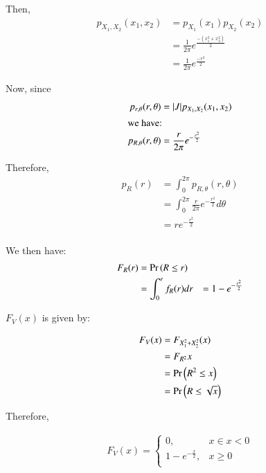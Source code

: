 \documentclass[journal,12pt,twocolumn]{IEEEtran}
\renewcommand\thesection{\arabic{section}}
\begin{document}
\begin{enumerate}[label=\thesection.\arabic*
,ref=\thesection.\theenumi]
Then, 
\begin{align}
    p_{X_1,X_2}(x_1,x_2) &= p_{X_1}(x_1)p_{X_2}(x_2) \\
    &= \frac{1}{2\pi} e^{\frac{-(x_1^2+x_2^2)}{2}} \\
    &= \frac{1}{2\pi} e^{\frac{-r^2}{2}}
\end{align}

Now, since 
\begin{align}
    p_{r, \theta}(r, \theta) &= |J|p_{X_1, X_2}(x_1, x_2)      \\   
\intertext{we have:}     
p_{R, \theta}(r, \theta) & = \frac{r}{2\pi} e^{-\frac{r^2}{2}}                                                    
\end{align}

Therefore, 
\begin{align}
    p_R(r)                   & = \int_0^{2\pi} p_{R, \theta}(r, \theta)                                                     \\
    & = \int_0^{2\pi} \frac{r}{2\pi} e^{-\frac{r^2}{2}} d\theta                                    \\
    & = r e^{-\frac{r^2}{2}}                                                                       \\
\end{align}

We then have:
\begin{align}
    F_R(r) &= \Pr\left(R \leq r\right) \\
    &= \int _{0} ^r f_R(r) dr
    &= 1 - e^{-\frac{r^2}{2}}
\end{align}

$F_V(x)$ is given by:

\begin{align}
    F_V(x) &= F_{X_1^2+X_2^2}(x) \\
    &= F_{R^2}{x} \\
    &= \Pr\left(R^2 \leq x\right) \\
    &= \Pr\left(R \leq \sqrt{x}\right) 
\end{align}

Therefore, 


\begin{align}
    F_V(x) = 
    \begin{cases}
        0, & x \in x < 0 \\
        1 - e^{-\frac{x}{2}}, & x \geq  0\\
    \end{cases}
\end{align}


\end{enumerate}
\end{document}
